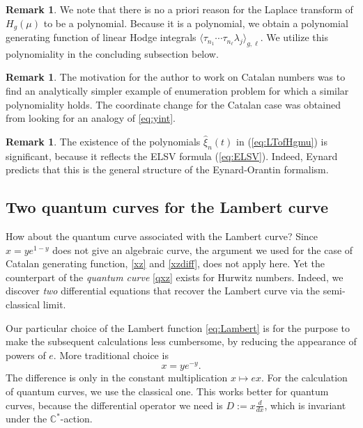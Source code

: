 \documentclass{amsart}
\theoremstyle{definition}
\newtheorem{rem}[thm]{Remark}
\numberwithin{equation}{section}
\numberwithin{figure}{section}
\newcommand{\be}{\begin{equation}}
\newcommand{\ee}{\end{equation}}
\newcommand{\bC}{{\mathbb{C}}}
\newcommand{\la}{{\langle}}
\newcommand{\ra}{{\rangle}}
\newcommand{\hxi}{{\hat{\xi}}}
\begin{document}
\begin{rem}
We note that there is no a priori reason for 
the Laplace transform of $H_g(\mu)$ to be
a polynomial. Because it is a polynomial,
we obtain a polynomial generating function 
of linear Hodge integrals
$\la \tau_{n_1}\cdots \tau_{n_\ell}\lambda_j\ra_{g,\ell}$.
We utilize this polynomiality in the concluding subsection below.
\end{rem}

\begin{rem}
The motivation for the author to work on
Catalan numbers  \cite{DMSS,OM4} was to find an analytically
simpler example of enumeration problem for which a similar
polynomiality holds. The coordinate change for the Catalan case was 
obtained from looking for an analogy of \eqref{eq:yint}.
\end{rem}


\begin{rem}
The existence of the polynomials $\hxi_n(t)$
in (\ref{eq:LTofHgmu}) is significant,
because it reflects the ELSV formula (\ref{eq:ELSV}).
Indeed, Eynard  predicts that 
this is the general structure of the Eynard-Orantin
formalism.
\end{rem}


\subsection{Two quantum curves for the Lambert curve}
\label{FugueQC}

How about the quantum curve associated with the Lambert curve?
Since $x=y e^{1-y}$ does not give an algebraic curve,
the argument we used for the case of Catalan generating function,
\eqref{xz} and \eqref{xzdiff},
does not apply here. 
Yet the counterpart of the \emph{quantum curve} \eqref{qxz}
exists for Hurwitz numbers. Indeed, we discover \emph{two}
differential equations that recover the Lambert curve
via the semi-classical limit. 


Our particular choice of the Lambert function \eqref{eq:Lambert} is for the purpose
to make the subsequent calculations less cumbersome,
by reducing the appearance of  powers of $e$. More traditional 
choice is
\be
\label{classicalLambert}
x = y e^{-y}.
\ee 
The difference is only in the constant multiplication $x\longmapsto ex$. 
For the calculation of quantum curves, we use the classical one.
This works better for quantum curves, because the differential operator we need
is $D:= x\frac{d}{dx}$, which is invariant under the $\bC^*$-action. 
\end{document}
